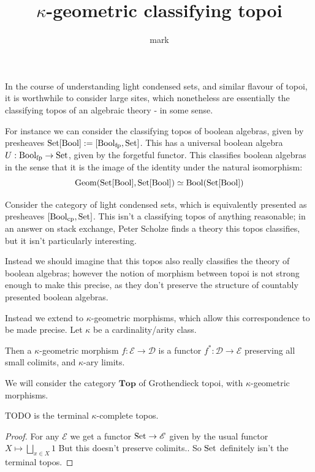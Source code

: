 \documentclass{article}
\title{$\kappa$-geometric classifying topoi}
\author{mark}
\begin{document}
\maketitle

In the course of understanding light condensed sets, and similar flavour of topoi, it is worthwhile to consider large sites, which nonetheless are essentially the classifying topos
of an algebraic theory - in some sense.

For instance we can consider the classifying topos of boolean algebras, given by presheaves $\mathrm{Set}[\mathrm{Bool}] := [\mathrm{Bool}_{\mathrm{fp}}, \mathrm{Set}]$.
This has a universal boolean algebra $U : \mathrm{Bool}_{\mathrm{fp}} \to \mathrm{Set}$, given by the forgetful functor.
This classifies boolean algebras in the sense that it is the image of the identity under the natural isomorphism:
\[ \mathrm{Geom}(\mathrm{Set}[\mathrm{Bool}], \mathrm{Set}[\mathrm{Bool}]) \simeq \mathrm{Bool}(\mathrm{Set}[\mathrm{Bool}]) \] 

Consider the category of light condensed sets, which is equivalently presented as presheaves $[\mathrm{Bool}_{\mathrm{cp}}, \mathrm{Set}]$.
This isn't a classifying topos of anything reasonable; in an answer on stack exchange, Peter Scholze finds a theory 
this topos classifies, but it isn't particularly interesting.

Instead we should imagine that this topos also really classifies the theory of boolean algebras; however the notion of morphism between topoi is not 
strong enough to make this precise, as they don't preserve the structure of countably presented boolean algebras.

Instead we extend to $\kappa$-geometric morphisms, which allow this correspondence to be made precise.
Let $\kappa$ be a cardinality/arity class. 

\begin{definition}
  Then a $\kappa$-geometric morphism $f : \mathscr{E} \to \mathscr{D}$ is a functor 
  $f^\ast : \mathscr{D} \to \mathscr{E}$ preserving all small colimits, and $\kappa$-ary limits.
\end{definition}

We will consider the category $\mathbf{Top}$ of Grothendieck topoi, with $\kappa$-geometric morphisms.

\begin{lemma}
  $\text{TODO}$ is the terminal $\kappa$-complete topos.
\end{lemma}
\begin{proof}
  For any $\mathscr{E}$ we get a functor $\mathrm{Set} \to \mathscr{E}$ given by the usual functor $X \mapsto \bigsqcup_{x \in X} 1$
  But this doesn't preserve colimits.. 
  So $\mathrm{Set}$ definitely isn't the terminal topos. 
\end{proof}
\end{document}
